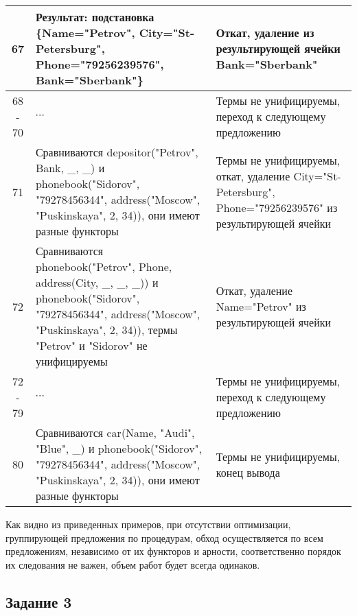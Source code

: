 \documentclass[a4paper,12pt]{article}
\begin{document}
\newpage
\begin{table}[ht!] 
	\begin{tabularx}{\linewidth}{|c|>{\centering}X|>{\centering}X|}
		\hline
		67 & Результат: подстановка \{Name="Petrov"{}, City="St-Petersburg"{}, Phone="79256239576"{}, Bank="Sberbank"\} & Откат, удаление из результирующей ячейки Bank="Sberbank"{}\tabularnewline
		\hline
		68 - 70  & $\cdots$ & Термы не унифицируемы, переход к следующему предложению \tabularnewline
		\hline
		71 & Сравниваются depositor("Petrov"{}, Bank, \_, \_) и phonebook("Sidorov"{}, "79278456344"{}, address("Moscow"{}, "Puskinskaya"{}, 2, 34)), они имеют разные функторы & Термы не унифицируемы, откат, удаление City="St-Petersburg"{}, Phone="79256239576"{} из результирующей ячейки \tabularnewline
		\hline
		72 & Сравниваются phonebook("Petrov"{}, Phone, address(City, \_, \_, \_)) и phonebook("Sidorov"{}, "79278456344"{}, address("Moscow"{}, "Puskinskaya"{}, 2, 34)), термы  "Petrov"{} и "Sidorov"{} не унифицируемы & Откат, удаление Name="Petrov"{} из результирующей ячейки \tabularnewline
		\hline
		72 - 79 & $\cdots$ & Термы не унифицируемы, переход к следующему предложению \tabularnewline
		\hline
		80 & Сравниваются car(Name, "Audi"{}, "Blue"{}, \_) и phonebook("Sidorov"{}, "79278456344"{}, address("Moscow"{}, "Puskinskaya"{}, 2, 34)), они имеют разные функторы & Термы не унифицируемы, конец вывода \tabularnewline
\hline
	\end{tabularx}
\end{table}

Как видно из приведенных примеров, при отсутствии оптимизации, группирующей предложения по процедурам, обход осуществляется по всем предложениям, независимо от их функторов и арности, соответственно порядок их следования не важен, объем работ будет всегда одинаков.
 
\subsection*{Задание 3}
\end{document}

